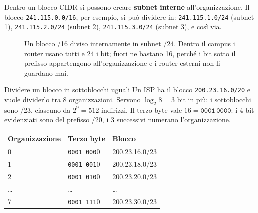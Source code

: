 Dentro un blocco CIDR si possono creare \textbf{subnet interne} all'organizzazione. Il blocco \texttt{241.115.0.0/16}, per
esempio, si può dividere in:
\texttt{241.115.1.0/24} (subnet 1), \texttt{241.115.2.0/24} (subnet 2), \texttt{241.115.3.0/24} (subnet 3), e così via.

\begin{figure}[H]
\centering
{}
\caption{Un blocco /16 diviso internamente in subnet /24. Dentro il campus i router usano tutti e 24 i bit; fuori ne
         bastano 16, perché i bit sotto il prefisso appartengono all'organizzazione e i router esterni non li guardano mai.}
\end{figure}

\begin{esempio}{Dividere un blocco in sottoblocchi uguali}
Un ISP ha il blocco \texttt{200.23.16.0/20} e vuole dividerlo tra 8 organizzazioni. Servono $\log_2 8 = 3$ bit in più: i
sottoblocchi sono /23, ciascuno da $2^9 = 512$ indirizzi. Il terzo byte vale $16 = \texttt{0001}\,\texttt{0000}$: i 4 bit
evidenziati sono del prefisso /20, i 3 successivi numerano l'organizzazione.
\begin{center}
\begin{tabular}{lll}
\toprule
\textbf{Organizzazione} & \textbf{Terzo byte} & \textbf{Blocco} \\
\midrule
0 & \texttt{0001 000}0 & 200.23.16.0/23 \\
1 & \texttt{0001 001}0 & 200.23.18.0/23 \\
2 & \texttt{0001 010}0 & 200.23.20.0/23 \\
\dots & \dots & \dots \\
7 & \texttt{0001 111}0 & 200.23.30.0/23 \\
\bottomrule
\end{tabular}
\end{center}
\end{esempio}

